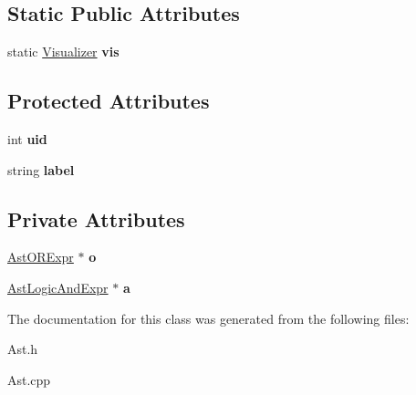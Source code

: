 \subsection*{Static Public Attributes}
\begin{DoxyCompactItemize}
\item 
\hypertarget{classAST_aca9e6637209b31e03a09c0d42f29bdfa}{static \hyperlink{classVisualizer}{Visualizer} {\bfseries vis}}\label{classAST_aca9e6637209b31e03a09c0d42f29bdfa}

\end{DoxyCompactItemize}
\subsection*{Protected Attributes}
\begin{DoxyCompactItemize}
\item 
\hypertarget{classAST_a847b778f1c3dd5a19de32de432ee6e15}{int {\bfseries uid}}\label{classAST_a847b778f1c3dd5a19de32de432ee6e15}

\item 
\hypertarget{classAST_ab2e239ccc0688d2341724432ff5a1a31}{string {\bfseries label}}\label{classAST_ab2e239ccc0688d2341724432ff5a1a31}

\end{DoxyCompactItemize}
\subsection*{Private Attributes}
\begin{DoxyCompactItemize}
\item 
\hypertarget{classAstLogicAndExpr_a1133c2d85c0c471648c56ee9aae03aa6}{\hyperlink{classAstORExpr}{Ast\-O\-R\-Expr} $\ast$ {\bfseries o}}\label{classAstLogicAndExpr_a1133c2d85c0c471648c56ee9aae03aa6}

\item 
\hypertarget{classAstLogicAndExpr_af596fe2e0d1cfbd6cdd8d95f5e89f44a}{\hyperlink{classAstLogicAndExpr}{Ast\-Logic\-And\-Expr} $\ast$ {\bfseries a}}\label{classAstLogicAndExpr_af596fe2e0d1cfbd6cdd8d95f5e89f44a}

\end{DoxyCompactItemize}


The documentation for this class was generated from the following files\-:\begin{DoxyCompactItemize}
\item 
Ast.\-h\item 
Ast.\-cpp\end{DoxyCompactItemize}
